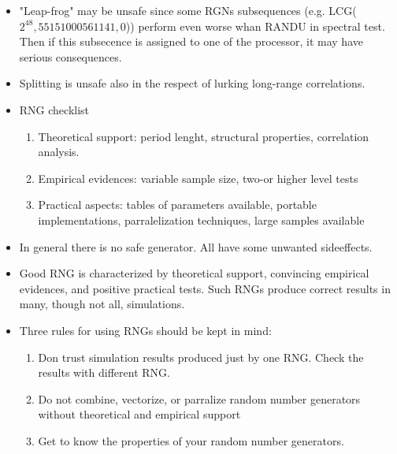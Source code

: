 \documentclass[10pt,a4paper]{article}
\begin{document}
\begin{itemize}
\item "Leap-frog" may be unsafe since some RGNs subsequences (e.g. LCG($2^{48},55151000561141,0$)) perform even worse whan RANDU in spectral test.
Then if this subsecence is assigned to one of the processor, it may have serious consequences. 
\item Splitting is unsafe also in the respect of lurking long-range correlations.
\item RNG checklist
 \begin{enumerate}
  \item Theoretical support: period lenght, structural properties, correlation analysis.
  \item Empirical evidences: variable sample size, two-or higher level tests
  \item Practical aspects: tables of parameters available, portable implementations, parralelization techniques, large samples available
 \end{enumerate}
\item In general there is no safe generator. All have some unwanted sideeffects. 
\item Good RNG is characterized by theoretical support, convincing empirical evidences, and positive practical tests. Such RNGs produce correct results in many, though not all, simulations.
\item Three rules for using RNGs should be kept in mind:
\begin{enumerate}
 \item Don trust simulation results produced just by one RNG. Check the results with different RNG.
 \item Do not combine, vectorize, or parralize random number generators without theoretical and empirical support
 \item Get to know the properties of your random number generators.
\end{enumerate}

\end{itemize}
\end{document}
